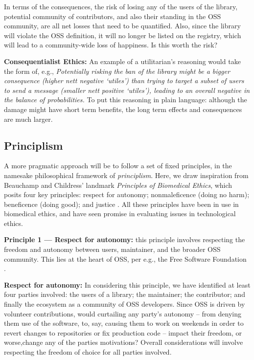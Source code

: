 \documentclass[journal,twocolumn]{IEEEtran}
\begin{document}
In terms of the consequences, the risk of losing any of the users of the library, potential community of contributors, and also their standing in the OSS community, are all net losses that need to be quantified. 
Also, since the library will violate the OSS definition, it will no longer be listed on the registry, which will lead to a community-wide loss of happiness. Is this worth the risk?

\begin{tcolorbox}
\textbf{Consequentialist Ethics:}
An example of a utilitarian's reasoning would take the form of, e.g., \textit{Potentially risking the ban of the library might be a bigger consequence (higher nett negative `utiles') than trying to target a subset of users to send a message (smaller nett positive `utiles'), leading to an overall negative in the balance of probabilities.} 
To put this reasoning in plain language: although the damage might have short term benefits, the long term effects and consequences are much larger. 
\end{tcolorbox}

\subsection{Principlism}
A more pragmatic approach will be to follow a set of fixed principles, in the namesake philosophical framework of \textit{principlism}. Here, we draw inspiration from Beauchamp and Childress' landmark \textit{Principles of Biomedical Ethics}, which posits four key principles: respect for autonomy; nonmaleficence (doing no harm); beneficence (doing good); and justice \cite{Beauchamp1994}. All these principles have been in use in biomedical ethics, and have seen promise in evaluating issues in technological ethics.

\begin{tcolorbox}
    \textbf{Principle 1 --- Respect for autonomy:} this principle involves respecting the freedom and autonomy between users, maintainer, and the broader OSS community. This lies at the heart of OSS, per e.g., the Free Software Foundation \cite{GNU}. 
\end{tcolorbox}

\textbf{Respect for autonomy:} In considering this principle, we have identified at least four parties involved: the users of a library; the maintainer; the contributor; and finally the ecosystem as a community of OSS developers.
Since OSS is driven by volunteer contributions, would curtailing any party's autonomy -- from denying them use of the software, to, say, causing them to work on weekends in order to revert changes to repositories or fix production code -- impact their freedom, or worse,change any of the parties motivations? Overall considerations will involve respecting the freedom of choice for all parties involved.
\end{document}
